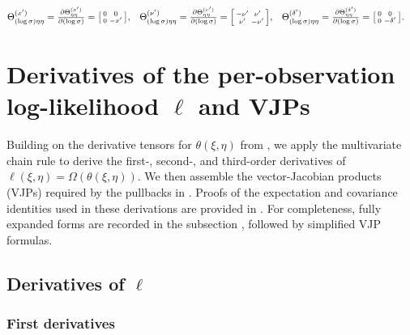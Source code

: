 \documentclass{article}
\begin{document}
\begin{align}
  \Theta_{(\log \sigma)\eta\eta}^{(x')} & = \tfrac{\partial \Theta_{\eta\eta}^{(x')}}{\partial (\log \sigma)} = \begin{bsmallmatrix} 0 & 0 \\ 0 & -x' \end{bsmallmatrix}, &  & \Theta_{(\log \sigma)\eta\eta}^{(\nu')} = \tfrac{\partial \Theta_{\eta\eta}^{(\nu')}}{\partial (\log \sigma)} = \begin{bsmallmatrix} -\nu' & \nu' \\ \nu' & -\nu' \end{bsmallmatrix}, &  & \Theta_{(\log \sigma)\eta\eta}^{(\delta')} = \tfrac{\partial \Theta_{\eta\eta}^{(\delta')}}{\partial (\log \sigma)} = \begin{bsmallmatrix} 0 & 0 \\ 0 & -\delta' \end{bsmallmatrix} \label{eq:third-derivative-theta-log-sigma-eta-eta}.
\end{align}

\section{Derivatives of the per-observation log-likelihood $\ell$ and VJPs}\label{app:ell-derivatives}

Building on the derivative tensors for $\theta(\xi,\eta)$ from , we apply the multivariate chain rule to derive the first-, second-, and third-order derivatives of $\ell(\xi,\eta) = \Omega(\theta(\xi,\eta))$.
We then assemble the vector-Jacobian products (VJPs) required by the pullbacks in .
Proofs of the expectation and covariance identities used in these derivations are provided in .
For completeness, fully expanded forms are recorded in the subsection , followed by simplified VJP formulas.

\subsection{Derivatives of $\ell$}

\subsubsection{First derivatives}
\end{document}
